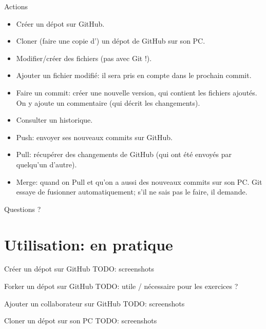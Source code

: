 \documentclass{beamer}
\begin{document}
\begin{frame}{Actions}
    \begin{itemize}
        \item Créer un dépot sur GitHub.
        \item Cloner (faire une copie d') un dépot de GitHub sur son PC.
        \item Modifier/créer des fichiers (pas avec Git !).
        \item Ajouter un fichier modifié: il sera pris en compte dans le
            prochain commit.
        \item Faire un commit: créer une nouvelle version, qui contient les
            fichiers ajoutés. On y ajoute un commentaire (qui décrit les
            changements).
        \item Consulter un historique.
        \item Push: envoyer ses nouveaux commits sur GitHub.
        \item Pull: récupérer des changements de GitHub (qui ont été envoyés
            par quelqu'un d'autre).
        \item Merge: quand on Pull et qu'on a aussi des nouveaux commits sur
            son PC. Git essaye de fusionner automatiquement; s'il ne sais pas
            le faire, il demande.
    \end{itemize}
\end{frame}

\begin{frame}[standout]
    Questions ?
\end{frame}


\section{Utilisation: en pratique}

\begin{frame}{Créer un dépot sur GitHub}
    TODO: screenshots
\end{frame}

\begin{frame}{Forker un dépot sur GitHub}
    TODO: utile / nécessaire pour les exercices ?
\end{frame}

\begin{frame}{Ajouter un collaborateur sur GitHub}
    TODO: screenshots
\end{frame}

\begin{frame}{Cloner un dépot sur son PC}
    TODO: screenshots
\end{frame}
\end{document}
